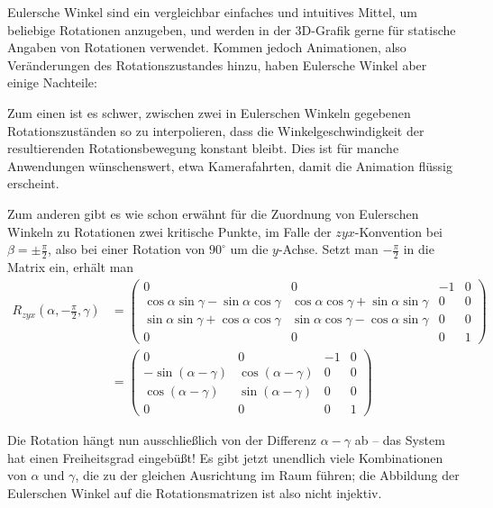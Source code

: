 Eulersche Winkel sind ein vergleichbar einfaches und intuitives Mittel, um beliebige Rotationen anzugeben, und werden in der 3D-Grafik gerne für statische Angaben von Rotationen verwendet. Kommen jedoch Animationen, also Veränderungen des Rotationszustandes hinzu, haben Eulersche Winkel aber einige Nachteile:

Zum einen ist es schwer, zwischen zwei in Eulerschen Winkeln gegebenen Rotationszuständen so zu interpolieren, dass die Winkelgeschwindigkeit der resultierenden Rotationsbewegung konstant bleibt. Dies ist für manche Anwendungen wünschenswert, etwa Kamerafahrten, damit die Animation flüssig erscheint.

Zum anderen gibt es wie schon erwähnt für die Zuordnung von Eulerschen Winkeln zu Rotationen zwei kritische Punkte, im Falle der $zyx$-Konvention bei $\beta = \pm \frac{\pi}{2}$, also bei einer Rotation von $90^\circ$ um die $y$-Achse. Setzt man $-\frac{\pi}{2}$ in die Matrix ein, erhält man
\begin{equation}
\begin{split}
 R_{zyx}{\left(\alpha, -\frac{\pi}{2}, \gamma \right)}
 & = 
 \begin{pmatrix}
  0 & 0 & -1 & 0 \\
  \cos \alpha \sin \gamma - \sin \alpha \cos \gamma & \cos \alpha \cos \gamma + \sin \alpha \sin \gamma & 0 & 0 \\
  \sin \alpha \sin \gamma + \cos \alpha \cos \gamma & \sin \alpha \cos \gamma - \cos \alpha \sin \gamma & 0 & 0 \\
  0 & 0 & 0 & 1
 \end{pmatrix} \\
 & = 
 \begin{pmatrix}
  0 & 0 & -1 & 0 \\
  -\sin ( \alpha - \gamma ) &  \cos ( \alpha - \gamma ) & 0 & 0 \\
  \cos ( \alpha - \gamma ) & \sin ( \alpha - \gamma ) & 0 & 0 \\
  0 & 0 & 0 & 1
 \end{pmatrix}
\end{split}
\end{equation}

Die Rotation hängt nun ausschließlich von der Differenz $\alpha - \gamma$ ab -- das System hat einen Freiheitsgrad eingebüßt! Es gibt jetzt unendlich viele Kombinationen von $\alpha$ und $\gamma$, die zu der gleichen Ausrichtung im Raum führen; die Abbildung der Eulerschen Winkel auf die Rotationsmatrizen ist also nicht injektiv.

